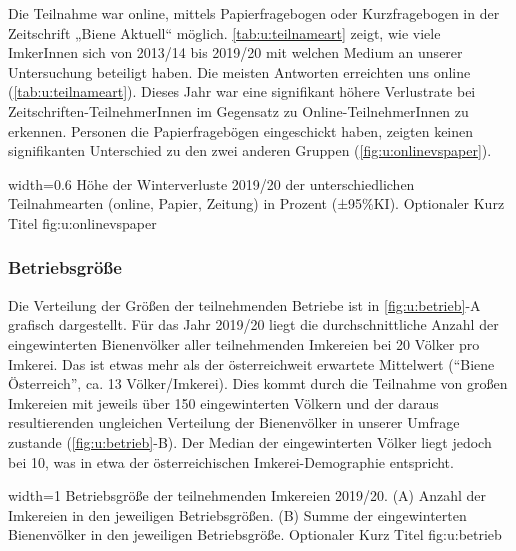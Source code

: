Die Teilnahme war online, mittels Papierfragebogen oder Kurzfragebogen in der Zeitschrift „Biene Aktuell`` möglich. \cref{tab:u:teilnameart} zeigt, wie viele ImkerInnen sich von 2013/14 bis 2019/20 mit welchen Medium an unserer Untersuchung beteiligt haben. Die meisten Antworten erreichten uns online (\cref{tab:u:teilnameart}). Dieses Jahr war eine signifikant höhere Verlustrate bei Zeitschriften-TeilnehmerInnen  im Gegensatz zu Online-TeilnehmerInnen  zu erkennen. Personen die Papierfragebögen eingeschickt haben, zeigten keinen signifikanten Unterschied zu den zwei anderen Gruppen  (\cref{fig:u:onlinevspaper}). 

  {width=0.6\textwidth} %
  {Höhe der Winterverluste 2019/20 der unterschiedlichen Teilnahmearten (online, Papier, Zeitung) in Prozent (±95\%KI).} %
  {Optionaler Kurz Titel} %
  {fig:u:onlinevspaper} %



\subsubsection{Betriebsgröße}

Die Verteilung der Größen der teilnehmenden Betriebe ist in \cref{fig:u:betrieb}-A grafisch dargestellt. Für das Jahr 2019/20 liegt die durchschnittliche Anzahl der eingewinterten Bienenvölker aller teilnehmenden Imkereien bei 20 Völker pro Imkerei. Das ist etwas mehr als der österreichweit erwartete Mittelwert (\enquote{Biene Österreich}, ca. 13 Völker/Imkerei). Dies kommt durch die Teilnahme von großen Imkereien mit jeweils über 150 eingewinterten Völkern und der daraus resultierenden ungleichen Verteilung der Bienenvölker in unserer Umfrage zustande (\cref{fig:u:betrieb}-B). Der Median der eingewinterten Völker liegt jedoch bei 10, was in etwa der österreichischen Imkerei-Demographie entspricht. 

  {width=1\textwidth} %
  {Betriebsgröße der teilnehmenden Imkereien 2019/20. (A) Anzahl der Imkereien in den jeweiligen Betriebsgrößen. (B) Summe der eingewinterten Bienenvölker in den jeweiligen Betriebsgröße.} %
  {Optionaler Kurz Titel} %
  {fig:u:betrieb} %

